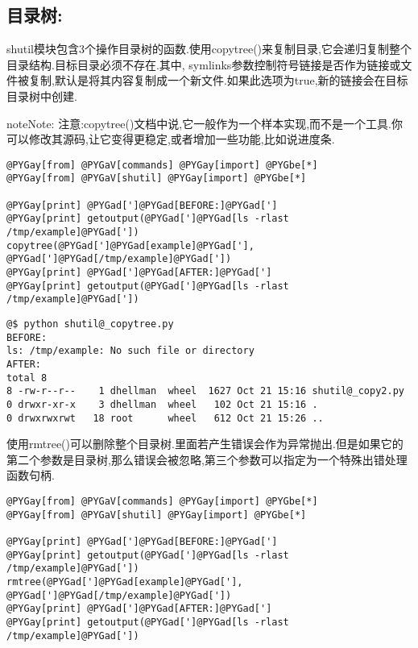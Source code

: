 \documentclass[a4paper,10pt,english]{manual}
\begin{document}
\subsection{目录树:}

shutil模块包含3个操作目录树的函数.使用copytree()来复制目录,它会递归复制整个目录结构.目标目录必须不存在.其中, symlinks参数控制符号链接是否作为链接或文件被复制,默认是将其内容复制成一个新文件.如果此选项为true,新的链接会在目标目录树中创建.

\begin{notice}{note}{Note:}
注意:copytree()文档中说,它一般作为一个样本实现,而不是一个工具.你可以修改其源码,让它变得更稳定,或者增加一些功能,比如说进度条.
\end{notice}

\begin{Verbatim}[commandchars=@\[\]]
@PYGay[from] @PYGaV[commands] @PYGay[import] @PYGbe[*]
@PYGay[from] @PYGaV[shutil] @PYGay[import] @PYGbe[*]

@PYGay[print] @PYGad[']@PYGad[BEFORE:]@PYGad[']
@PYGay[print] getoutput(@PYGad[']@PYGad[ls -rlast /tmp/example]@PYGad['])
copytree(@PYGad[']@PYGad[example]@PYGad['], @PYGad[']@PYGad[/tmp/example]@PYGad['])
@PYGay[print] @PYGad[']@PYGad[AFTER:]@PYGad[']
@PYGay[print] getoutput(@PYGad[']@PYGad[ls -rlast /tmp/example]@PYGad['])
\end{Verbatim}

\begin{Verbatim}[commandchars=@\[\]]
@$ python shutil@_copytree.py
BEFORE:
ls: /tmp/example: No such file or directory
AFTER:
total 8
8 -rw-r--r--    1 dhellman  wheel  1627 Oct 21 15:16 shutil@_copy2.py
0 drwxr-xr-x    3 dhellman  wheel   102 Oct 21 15:16 .
0 drwxrwxrwt   18 root      wheel   612 Oct 21 15:26 ..
\end{Verbatim}

使用rmtree()可以删除整个目录树.里面若产生错误会作为异常抛出.但是如果它的第二个参数是目录树,那么错误会被忽略,第三个参数可以指定为一个特殊出错处理函数句柄.

\begin{Verbatim}[commandchars=@\[\]]
@PYGay[from] @PYGaV[commands] @PYGay[import] @PYGbe[*]
@PYGay[from] @PYGaV[shutil] @PYGay[import] @PYGbe[*]

@PYGay[print] @PYGad[']@PYGad[BEFORE:]@PYGad[']
@PYGay[print] getoutput(@PYGad[']@PYGad[ls -rlast /tmp/example]@PYGad['])
rmtree(@PYGad[']@PYGad[example]@PYGad['], @PYGad[']@PYGad[/tmp/example]@PYGad['])
@PYGay[print] @PYGad[']@PYGad[AFTER:]@PYGad[']
@PYGay[print] getoutput(@PYGad[']@PYGad[ls -rlast /tmp/example]@PYGad['])
\end{Verbatim}
\end{document}
